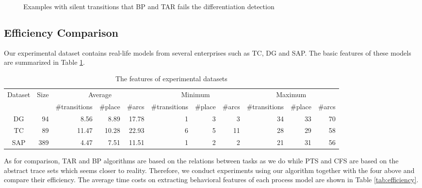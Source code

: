 \documentclass[dvips,...]{llncs}
\begin{document}
\begin{figure}[htbp]
{\begin{minipage}[b]{0.38\textwidth}
	\end{minipage}
	\label{fig:silentExampleC}
}
\caption{Examples with silent transitions that BP and TAR fails the differentiation detection\label{fig:silentExamples}}
\end{figure}

\subsection{Efficiency Comparison}\label{subsec:efficiency}
Our experimental dataset contains real-life models from several enterprises such as TC, DG and SAP. The basic features of these models are summarized in Table \ref{tab:datasets}.

\begin{table}[htbp]
\centering
\caption{The features of experimental datasets\label{tab:datasets}}
\scriptsize
\begin{tabular}{|c|r|r|r|r|r|r|r|r|r|r|} \hline
	\multicolumn{1}{|c|}{\multirow{2}{*}{Dataset}} & \multicolumn{1}{c|}{\multirow{2}{*}{Size}} & \multicolumn{3}{|c}{Average} & \multicolumn{3}{|c}{Minimum} & \multicolumn{3}{|c|}{Maximum}\\ \cline{3-11}
	\multicolumn{1}{|c|}{} & \multicolumn{1}{c|}{} & \multicolumn{1}{c|}{\#transitions} & \multicolumn{1}{c|}{\#place} & \multicolumn{1}{c|}{\#arcs} & \multicolumn{1}{c|}{\#transitions} & \multicolumn{1}{c|}{\#place} & \multicolumn{1}{c|}{\#arcs} & \multicolumn{1}{c|}{\#transitions} & \multicolumn{1}{c|}{\#place} & \multicolumn{1}{c|}{\#arcs}\\ \hline
	DG & 94 & 8.56 & 8.89 & 17.78 & 1 & 3 & 3 & 34 & 33 & 70 \\ \hline
	TC & 89 & 11.47 & 10.28 & 22.93 & 6 & 5 & 11 & 28 & 29 & 58 \\ \hline
	SAP & 389 & 4.47 & 7.51 & 11.51 & 1 & 2 & 2 & 21 & 31 & 56 \\ \hline
\end{tabular}
\end{table}

As for comparison, TAR and BP algorithms are based on the relations between tasks as we do while PTS and CFS are based on the abstract trace sets which seems closer to reality. Therefore, we conduct experiments using our algorithm together with the four above and compare their efficiency. The average time costs on extracting behavioral features of each process model are shown in Table \ref{tab:efficiency}.
\end{document}
